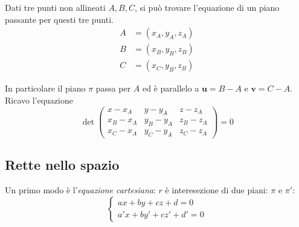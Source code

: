 Dati tre punti non allineati $ A, B, C $, si può trovare l'equazione di un piano passante per questi tre punti. \begin{align*}
    A &= (x_{A}, y_{A}, z_{A}   )\\
    B &= (x_{B}, y_{B}, z_{B}   )\\
    C &= (x_{C}, y_{B}, z_{B}   )
\end{align*}

In particolare il piano $ \pi $ passa per $ A $ ed è parallelo a $ \mathbf{u}=B-A $ e $ \mathbf{v}=C-A $. Ricavo l'equazione \[
    \det \begin{pmatrix}
        x-x_{A} & y-y_{A} & z-z_{A}\\
        x_{B} -x_{A} & y_{B} -y_{A} & z_{B} -z_{A}\\
        x_{C} -x_{A} & y_{C} -y_{A} & z_{C} -z_{A}
    \end{pmatrix}=0
\]


\subsection{Rette nello spazio}

Un primo modo è l'\textit{equazione cartesiana}: $ r $ è interesezione di due piani: $ \pi $ e $ \pi' $: \[
    \begin{cases}
        ax+by+cz+d=0\\
        a'x+by'+cz'+d'=0
    \end{cases}
\]

